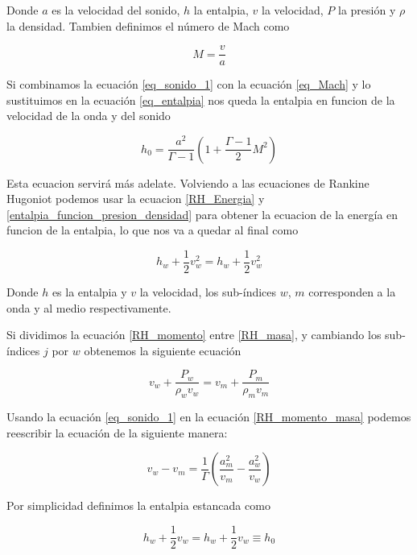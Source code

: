 \documentclass[12pt,a4paper]{book}
\begin{document}
Donde $a$ es la velocidad del sonido, $h$ la entalpia, $v$ la velocidad, $P$ la presión y $\rho$ la densidad. Tambien definimos el número de Mach como 

\begin{equation} \label{eq_Mach}
	M = \frac{v}{a}
\end{equation}

Si combinamos la ecuación \ref{eq_sonido_1} con la ecuación \ref{eq_Mach} y lo sustituimos en la ecuación \ref{eq_entalpia} nos queda la entalpia en funcion de la velocidad de la onda y del sonido

\begin{equation} \label{h_0_funcion_aire_mach}
	h_0 = \frac{a^2}{\Gamma - 1} \left( 1 + \frac{\Gamma - 1}{2} M^2 \right)
\end{equation}

Esta ecuacion servirá más adelate. Volviendo a las ecuaciones de Rankine Hugoniot podemos usar la ecuacion
\ref{RH_Energia} y \ref{entalpia_funcion_presion_densidad} para obtener la ecuacion de la energía en funcion de la entalpia, lo que nos va a quedar al final como

\begin{equation}\label{RH_entalpia}
  h_w +\frac{1}{2}v_w^2 = h_w +\frac{1}{2}v_w^2
\end{equation} 


Donde $ h $ es la entalpia y $v$ la velocidad, los sub-índices $w$, $m$ corresponden a la onda y al medio respectivamente.

Si dividimos la ecuación \ref{RH_momento} entre \ref{RH_masa}, y cambiando los sub-índices $j$ por $w$
obtenemos la siguiente ecuación 

\begin{equation} \label{RH_momento_masa}
  v_w + \frac{P_w}{\rho_w v_w} = v_m + \frac{P_m}{\rho_m v_m}
\end{equation}

Usando la ecuación \ref{eq_sonido_1} en la ecuación \ref{RH_momento_masa} podemos reescribir la ecuación de 
la siguiente manera:

\begin{equation} \label{eq_diferencia_velocidades}
  v_w-v_m = \frac{1}{\Gamma} \left(\frac{a_m^2}{v_m} - \frac{a_w^2}{v_w} \right)
\end{equation}

Por simplicidad definimos la entalpia estancada como 

\begin{equation}
  h_w + \frac{1}{2} v_w = h_w + \frac{1}{2} v_w \equiv h_0
\end{equation}
\end{document}
